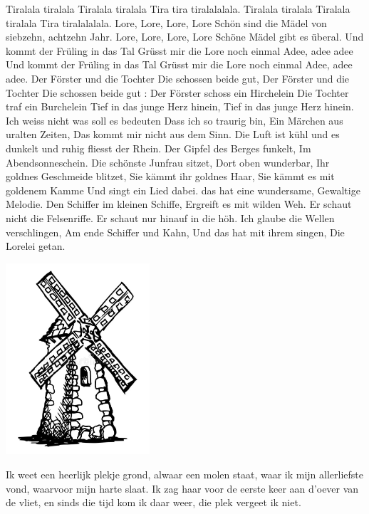 \documentclass{article}
\begin{document}
\begin{songs}{}
\endverse
\beginchorus
Tiralala tiralala
Tiralala tiralala
Tira tira tiralalalala.
Tiralala tiralala
Tiralala tiralala
Tira tiralalalala.
Lore, Lore, Lore, Lore
Schön sind die Mädel von siebzehn, achtzehn Jahr.
Lore, Lore, Lore, Lore
Schöne Mädel gibt es überal.
Und kommt der Früling in das Tal
Grüsst mir die Lore noch einmal
Adee, adee adee
Und kommt der Früling in das Tal
Grüsst mir die Lore noch einmal
Adee, adee adee.
\endchorus
\beginverse
Der Förster und die Tochter
Die schossen beide gut,
Der Förster und die Tochter
Die schossen beide gut :
Der Förster schoss ein Hirchelein
Die Tochter traf ein Burchelein
Tief in das junge Herz hinein,
Tief in das junge Herz hinein.
\endverse
\endsong
{}
\beginverse*
Ich weiss nicht was soll es bedeuten
Dass ich so traurig bin,
Ein Märchen aus uralten Zeiten,
Das kommt mir nicht aus dem Sinn.
Die Luft ist kühl und es dunkelt
und ruhig fliesst der Rhein.
Der Gipfel des Berges funkelt,
Im Abendsonneschein.
\endverse
\beginverse*
Die schönste Junfrau sitzet,
Dort oben wunderbar,
Ihr goldnes Geschmeide blitzet,
Sie kämmt ihr goldnes Haar,
Sie kämmt es mit goldenem Kamme
Und singt ein Lied dabei.
das hat eine wundersame,
Gewaltige Melodie. 
\endverse
\beginverse*
Den Schiffer im kleinen Schiffe,
Ergreift es mit wilden Weh.
Er schaut nicht die Felsenriffe.
Er schaut nur hinauf in die höh.
Ich glaube die Wellen verschlingen,
Am ende Schiffer und Kahn, 
Und das hat mit ihrem singen,
Die Lorelei getan.
\endverse
\endsong
\begin{intersong}
    \includegraphics[width=0.4\textwidth]{diemooiemolen}
\end{intersong}
\beginverse
Ik weet een heerlijk plekje grond, alwaar een molen staat,
waar ik mijn allerliefste vond, waarvoor mijn harte slaat.
Ik zag haar voor de eerste keer aan d’oever van de vliet, 
en sinds die tijd kom ik daar weer, die plek vergeet ik niet.

\end{songs}
\end{document}
